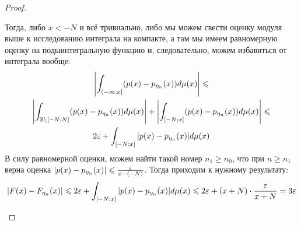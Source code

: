 \begin{proof}
\begin{enumerate}
		Тогда, либо $x < -N$ и всё тривиально, либо мы можем свести оценку модуля выше к исследованию интеграла на компакте, а там мы имеем равномерную оценку на подыинтегральную функцию и, следовательно, можем избавиться от интеграла вообще:
		\begin{multline*}
			\left|\int_{\left(-\infty; x\right]} (p(x) - p_{\eta_n}(x))d\mu(x)\right| \leqslant
			\\
			\left|\int_{\mathbb{R} \backslash [-N; N]} (p(x) - p_{\eta_n}(x))d\mu(x)\right| + \left|\int_{[-N; x]} (p(x) - p_{\eta_n}(x))d\mu(x)\right| \leqslant
			\\
			2\varepsilon + \int_{[-N; x]} |p(x) - p_{\eta_n}(x)|d\mu(x)
		\end{multline*}
		В силу равномерной оценки, можем найти такой номер $n_1 \ge n_0$, что при $n \ge n_1$ верна оценка $|p(x) - p_{\eta_n}(x)| \leqslant \frac{\varepsilon}{x - (-N)}$. Тогда приходим к нужному результату:
		\[
			\left|F(x) - F_{\eta_n}(x)\right| \leqslant 2\varepsilon + \int_{[-N; x]} |p(x) - p_{\eta_n}(x)|d\mu(x) \leqslant 2\varepsilon + (x + N) \cdot \frac{\varepsilon}{x + N} = 3\varepsilon
		\]
	\end{enumerate}
\end{proof}